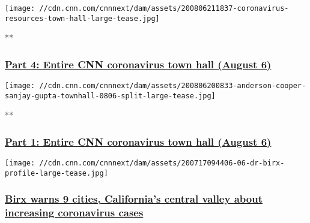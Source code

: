 \href{/videos/health/2020/08/06/entire-august-6-coronavirus-town-hall-part-4-sot-vpx.cnn}{}

\texttt{[image: //cdn.cnn.com/cnnnext/dam/assets/200806211837-coronavirus-resources-town-hall-large-tease.jpg]}

**

\hypertarget{part-4-entire-cnn-coronavirus-town-hall-august-6}{%
\subsubsection{\texorpdfstring{\href{/videos/health/2020/08/06/entire-august-6-coronavirus-town-hall-part-4-sot-vpx.cnn}{Part
4: Entire CNN coronavirus town hall (August
6)}}{Part 4: Entire CNN coronavirus town hall (August 6)}}\label{part-4-entire-cnn-coronavirus-town-hall-august-6}}

\href{/videos/health/2020/08/06/entire-august-6-coronavirus-town-hall-part-1-sot-vpx.cnn}{}

\texttt{[image: //cdn.cnn.com/cnnnext/dam/assets/200806200833-anderson-cooper-sanjay-gupta-townhall-0806-split-large-tease.jpg]}

**

\hypertarget{part-1-entire-cnn-coronavirus-town-hall-august-6}{%
\subsubsection{\texorpdfstring{\href{/videos/health/2020/08/06/entire-august-6-coronavirus-town-hall-part-1-sot-vpx.cnn}{Part
1: Entire CNN coronavirus town hall (August
6)}}{Part 1: Entire CNN coronavirus town hall (August 6)}}\label{part-1-entire-cnn-coronavirus-town-hall-august-6}}

\href{/2020/08/05/health/birx-warning-cities-coronavirus/index.html}{}

\texttt{[image: //cdn.cnn.com/cnnnext/dam/assets/200717094406-06-dr-birx-profile-large-tease.jpg]}

\hypertarget{birx-warns-9-cities-californias-central-valley-about-increasing-coronavirus-cases--1}{%
\subsubsection{\texorpdfstring{\href{/2020/08/05/health/birx-warning-cities-coronavirus/index.html}{Birx
warns 9 cities, California's central valley about increasing coronavirus
cases
}}{Birx warns 9 cities, California's central valley about increasing coronavirus cases }}\label{birx-warns-9-cities-californias-central-valley-about-increasing-coronavirus-cases--1}}

